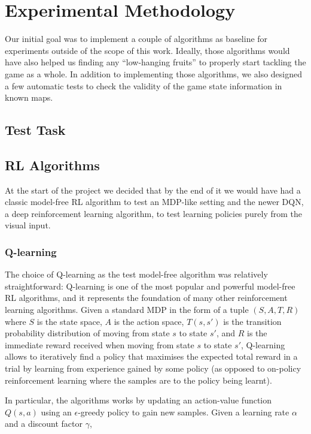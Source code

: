 \chapter{Experimental Methodology} 

Our initial goal was to implement a couple of algorithms as baseline for
experiments outside of the scope of this work. Ideally, those algorithms would
have also helped us finding any ``low-hanging fruits'' to properly start
tackling the game as a whole. In addition to implementing those algorithms, we
also designed a few automatic tests to check the validity of the game state
information in known maps.  

\section{Test Task}

\section{RL Algorithms}

At the start of the project we decided that by the end of it we would have had a
classic model-free RL algorithm to test an MDP-like setting and the newer DQN, a
deep reinforcement learning algorithm, to test learning policies purely from the
visual input. 

\subsection{Q-learning}

The choice of Q-learning as the test model-free algorithm was relatively
straightforward: Q-learning is one of the most popular and powerful model-free
RL algorithms, and it represents the foundation of many other reinforcement
learning algorithms. Given a standard MDP in the form of a tuple $(S, A, T, R)$
where $S$ is the state space, $A$ is the action space, $T(s, s')$ is the
transition probability distribution of moving from state $s$ to state $s'$, and
$R$ is the immediate reward received when moving from state $s$ to state $s'$,
Q-learning allows to iteratively find a policy that maximises the expected total
reward in a trial by learning from experience gained by some policy (as opposed
to on-policy reinforcement learning where the samples are  to the
policy being learnt).

In particular, the algorithms works by updating an action-value function $Q(s,
a)$ using an $\epsilon$-greedy policy to gain new samples. Given a learning rate
$\alpha$ and a discount factor $\gamma$,

